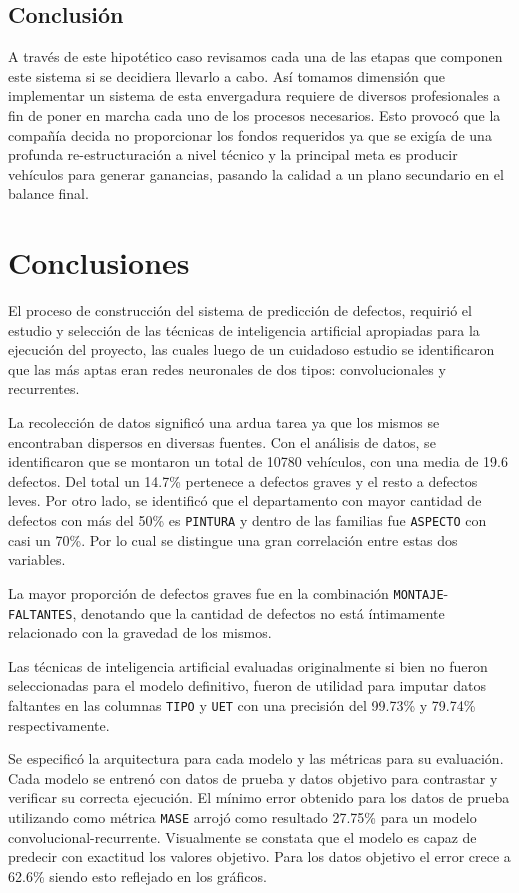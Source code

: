 \documentclass[a4paper,12pt]{article}
\begin{document}
		\subsection{Conclusión}
		A través de este hipotético caso revisamos cada una de las etapas que componen este sistema si se decidiera llevarlo a cabo. Así tomamos dimensión que implementar un sistema de esta envergadura requiere de diversos profesionales a fin de poner en marcha cada uno de los procesos necesarios. Esto provocó que la compañía decida no proporcionar los fondos requeridos ya que se exigía de una profunda re-estructuración a nivel técnico y la principal meta es producir vehículos para generar ganancias, pasando la calidad a un plano secundario en el balance final.
		\clearpage
				
		\section{Conclusiones}
		El proceso de construcción del sistema de predicción de defectos, requirió el estudio y selección de las técnicas de inteligencia artificial apropiadas para la ejecución del proyecto, las cuales luego de un cuidadoso estudio se identificaron que las más aptas eran redes neuronales de dos tipos: convolucionales y recurrentes.
				
		La recolección de datos significó una ardua tarea ya que los mismos se encontraban dispersos en diversas fuentes. Con el análisis de datos, se identificaron que se montaron un total de 10780 vehículos, con una media de 19.6 defectos. Del total un 14.7\% pertenece a defectos graves y el resto a defectos leves. Por otro lado, se identificó que el departamento con mayor cantidad de defectos con más del 50\% es \texttt{PINTURA} y dentro de las familias fue \texttt{ASPECTO} con casi un 70\%. Por lo cual se distingue una gran correlación entre estas dos variables.
				
		La mayor proporción de defectos graves fue en la combinación \texttt{MONTAJE}-\texttt{FALTANTES}, denotando que la cantidad de defectos no está íntimamente relacionado con la gravedad de los mismos.
				
		Las técnicas de inteligencia artificial evaluadas originalmente si bien no fueron seleccionadas para el modelo definitivo, fueron de utilidad para imputar datos faltantes en las columnas \texttt{TIPO} y \texttt{UET} con una precisión del 99.73\% y 79.74\% respectivamente.
				
		Se especificó la arquitectura para cada modelo y las métricas para su evaluación. Cada modelo se entrenó con datos de prueba y datos objetivo para contrastar y verificar su correcta ejecución. El mínimo error obtenido para los datos de prueba utilizando como métrica \texttt{MASE} arrojó como resultado 27.75\% para un modelo convolucional-recurrente. Visualmente se constata que el modelo es capaz de predecir con exactitud los valores objetivo. Para los datos objetivo el error crece a 62.6\% siendo esto reflejado en los gráficos. 
				
\end{document}
